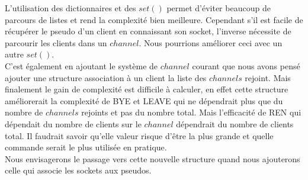 \documentclass[12pt]{article}
\begin{document}
L'utilisation des dictionnaires et des $set()$ permet d'éviter beaucoup de parcours
de listes et rend la complexité bien meilleure. Cependant s'il est facile de récupérer le
pseudo d'un client en connaissant son socket, l'inverse nécessite de parcourir les clients
dans un $channel$. Nous pourrions améliorer ceci avec un autre $set()$.
\\C'est également en ajoutant le système de $channel$ courant que nous avons pensé ajouter
une structure association à un client la liste des $channels$ rejoint. Mais finalement le
gain de complexité est difficile à calculer, en effet cette structure améliorerait la complexité
de BYE et LEAVE qui ne dépendrait plus que du nombre de $channels$ rejoints et pas du nombre total.
Mais l'efficacité de REN qui dépendait du nombre de clients sur le $channel$ dépendrait du nombre de clients
total. Il faudrait savoir qu'elle valeur risque d'être la plus grande et quelle commande serait
le plus utilisée en pratique.
\\Nous envisagerons le passage vers cette nouvelle structure quand nous ajouterons celle qui
associe les sockets aux pseudos.
\\
\end{document}
